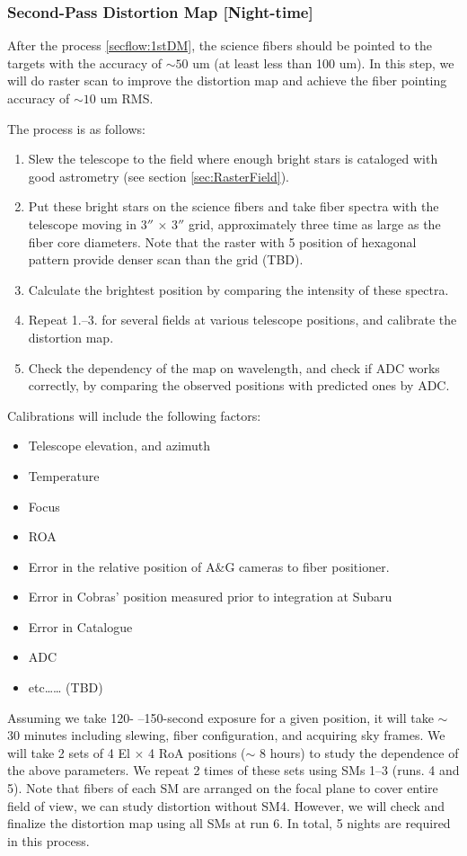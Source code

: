 \subsubsection{Second-Pass Distortion Map [Night-time]}\label{secflow:raster}

After the process \ref{secflow:1stDM}, the science fibers should be pointed to the targets with the accuracy of $\sim 50$ um (at least less than 100 um).
In this step, we will do raster scan to improve the distortion map and achieve the fiber pointing accuracy of $\sim 10$ um RMS.

The process is as follows:
\begin{enumerate}
\item Slew the telescope to the field where enough bright stars is cataloged with good astrometry (see section \ref{sec:RasterField}).
\item Put these bright stars on the science fibers and take fiber spectra with the telescope moving in 3$''$ $\times$ 3$''$ grid, approximately three time as large as the fiber core diameters.
Note that the raster with 5 position of hexagonal pattern provide denser scan than the grid (TBD).
\item Calculate the brightest position by comparing the intensity of these spectra.
\item Repeat 1.--3. for several fields at various telescope positions, and calibrate the distortion map.
\item Check the dependency of the map on wavelength, and check if ADC works correctly, by comparing the observed positions with predicted ones by ADC.
\end{enumerate}
Calibrations will include the following factors:
\begin{itemize}
\item Telescope elevation, and azimuth
\item Temperature
\item Focus
\item ROA
\item Error in the relative position of A\&G cameras to fiber positioner.
\item Error in Cobras' position measured prior to integration at Subaru
\item Error in Catalogue
\item ADC
\item etc…… (TBD)
\end{itemize}

Assuming we take 120- --150-second exposure for a given position, it will take $\sim$ 30 minutes including slewing, fiber configuration, and acquiring sky frames.
We will take 2 sets of 4 El $\times$ 4 RoA positions ($\sim$ 8 hours) to study the dependence of the above parameters.
We repeat 2 times of these sets using SMs 1--3 (runs. 4 and 5).
Note that fibers of each SM are arranged on the focal plane to cover entire field of view, we can study distortion without SM4.
However, we will check and finalize the distortion map using all SMs at run 6.
In total, 5 nights are required in this process.

